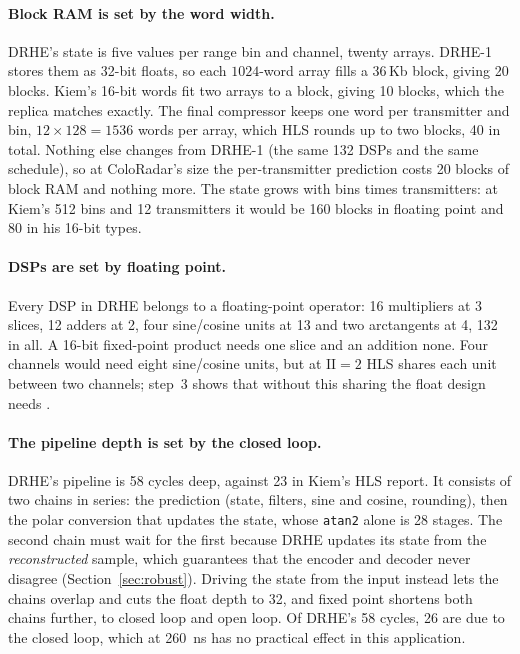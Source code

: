 \paragraph{Block RAM is set by the word width.} DRHE's state is five values per
range bin and channel, twenty arrays. DRHE-1 stores them as 32-bit floats, so
each $1024$-word array fills a 36\,Kb block, giving 20 blocks. Kiem's 16-bit
words fit two arrays to a block, giving 10 blocks, which the replica matches
exactly. The final compressor keeps one word per transmitter and bin,
$12 \times 128 = 1536$ words per array, which HLS rounds up to two blocks, 40 in
total. Nothing else changes from DRHE-1 (the same 132 DSPs and the same
schedule), so at ColoRadar's size the per-transmitter prediction costs 20 blocks
of block RAM and nothing more. The state grows with bins times transmitters: at
Kiem's 512 bins and 12 transmitters it would be 160 blocks in floating point
and 80 in his 16-bit types.

\paragraph{DSPs are set by floating point.} Every DSP in DRHE belongs to a
floating-point operator: 16 multipliers at 3 slices, 12 adders at 2, four
sine/cosine units at 13 and two arctangents at 4, 132 in all. A 16-bit
fixed-point product needs one slice and an addition none. Four channels would
need eight sine/cosine units, but at $\mathrm{II} = 2$ HLS shares each unit
between two channels; step~3 shows that without this sharing the float design
needs .

\paragraph{The pipeline depth is set by the closed loop.} DRHE's pipeline is 58
cycles deep, against 23 in Kiem's HLS report. It consists of two chains in
series: the prediction (state, filters, sine and cosine, rounding), then the
polar conversion that updates the state, whose \texttt{atan2} alone is 28
stages. The second chain must wait for the first because DRHE updates its state
from the \emph{reconstructed} sample, which guarantees that the encoder and
decoder never disagree (Section~\ref{sec:robust}). Driving the state from the
input instead lets the chains overlap and cuts the float depth to 32, and fixed
point shortens both chains further, to  closed loop and
 open loop. Of DRHE's 58 cycles, 26 are due to the closed
loop, which at \SI{260}{\nano\second} has no practical effect in this
application.

